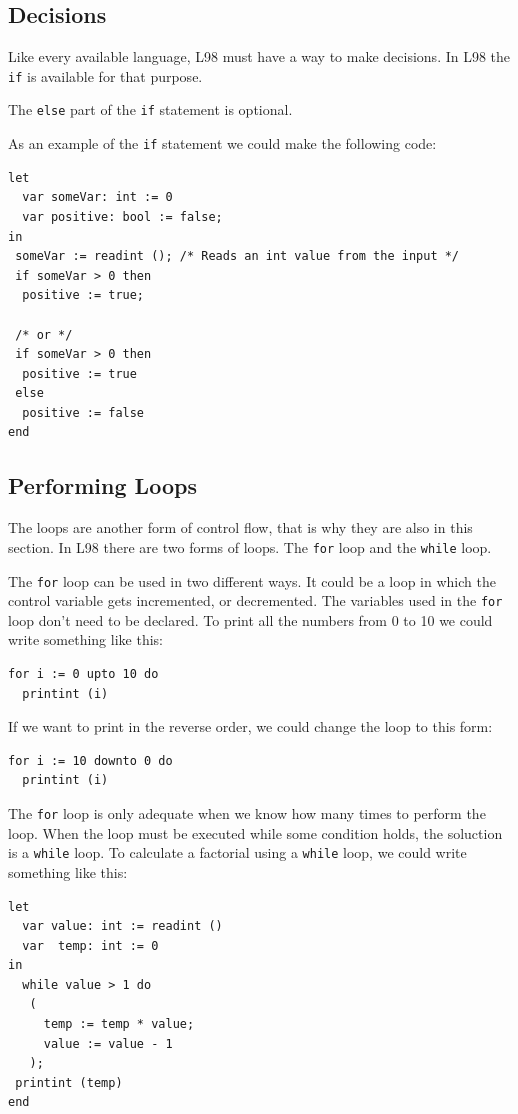 \documentclass[a4paper, 11pt]{report}
\newcommand{\keyword}[1]{\texttt{#1}}
\begin{document}
\subsection{Decisions}
Like every available language, L98 must have a way to make
decisions. In L98 the \keyword{if} is available for that
purpose.

The \keyword{else} part of the \keyword{if} statement is
optional.

As an example of the \keyword{if} statement we could make
the following code:

\begin{verbatim}
let
  var someVar: int := 0
  var positive: bool := false;
in
 someVar := readint (); /* Reads an int value from the input */
 if someVar > 0 then
  positive := true;

 /* or */
 if someVar > 0 then
  positive := true
 else
  positive := false
end
\end{verbatim}

\subsection{Performing Loops}
The loops are another form of control flow, that is why they are also in
this section.
In L98 there are two forms of loops. The \keyword{for} loop and the
\keyword{while} loop.

The \keyword{for} loop can be used in two different ways. It could be
a loop in which the control variable gets incremented, or decremented.
The variables used in the \keyword{for} loop don't need to be declared.
To print all the numbers from 0 to 10 we could write something like this:

\begin{verbatim}
for i := 0 upto 10 do
  printint (i)
\end{verbatim}

If we want to print in the reverse order, we could change the loop to
this form:
\begin{verbatim}
for i := 10 downto 0 do
  printint (i)
\end{verbatim}

The \keyword{for} loop is only adequate when we know how many
times to perform the loop. When the loop must be executed while some
condition holds, the soluction is a \keyword{while} loop. To calculate
a factorial using a \keyword{while} loop, we could write something like
this:

\begin{verbatim}
let
  var value: int := readint ()
  var  temp: int := 0
in
  while value > 1 do
   (
     temp := temp * value;
     value := value - 1
   );
 printint (temp)
end
\end{verbatim}
\end{document}
